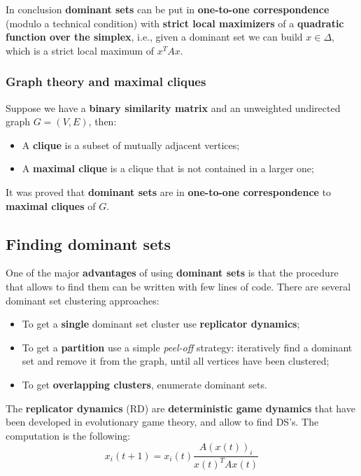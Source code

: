 In conclusion \textbf{dominant sets} can be put in \textbf{one-to-one correspondence} (modulo a technical condition) with \textbf{strict local maximizers} of a \textbf{quadratic function over the simplex}, i.e., given a dominant set we can build $x \in \Delta$, which is a strict local maximum of $x^TAx$. 

\subsubsection{Graph theory and maximal cliques}
Suppose we have a \textbf{binary similarity matrix} and an unweighted undirected graph $G = (V,E)$, then:

\begin{itemize}
    \item A \textbf{clique} is a subset of mutually adjacent vertices;
    \item A \textbf{maximal clique} is a clique that is not contained in a larger one;
\end{itemize}

It was proved that \textbf{dominant sets} are in \textbf{one-to-one correspondence} to \textbf{maximal cliques} of $G$. 

\subsection{Finding dominant sets}
One of the major \textbf{advantages} of using \textbf{dominant sets} is that the procedure that allows to find them can be written with few lines of code. There are several dominant set clustering approaches:
\begin{itemize}
	\item To get a \textbf{single} dominant set cluster use \textbf{replicator dynamics};
	\item To get a \textbf{partition} use a simple \textit{peel-off} strategy: iteratively find a dominant set and remove it from the graph, until all vertices have been clustered;
	\item To get \textbf{overlapping clusters}, enumerate dominant sets. 
\end{itemize}

The \textbf{replicator dynamics} (RD) are \textbf{deterministic game dynamics} that have been developed in evolutionary game theory, and allow to find DS's. The computation is the following:
$$
x_i(t+1) = x_i(t)\frac{A(x(t))_i}{x(t)^TAx(t)}
$$


